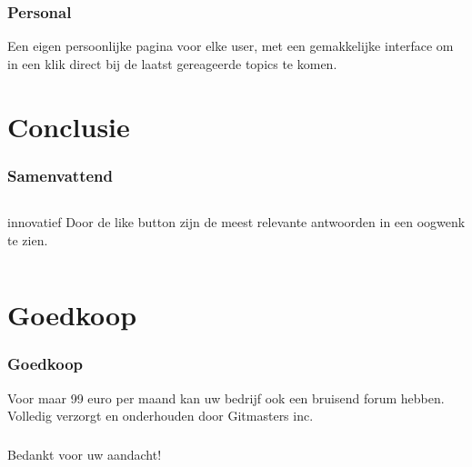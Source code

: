 \documentclass{beamer}
\begin{document}
\begin{frame}
\frametitle{Personal}
Een eigen persoonlijke pagina voor elke user, met een gemakkelijke interface om in een klik direct bij de laatst gereageerde topics te komen. 
\end{frame}



\section{Conclusie}

\begin{frame}
\frametitle{Samenvattend}
\begin{columns}
\begin{block}{innovatief}
Door de like button zijn de meest relevante antwoorden in een oogwenk te zien. 
\end{block}
\end{columns}
\end{frame}

\section{Goedkoop}

\begin{frame}
\frametitle{Goedkoop}
Voor maar 99 euro per maand kan uw bedrijf ook een bruisend forum hebben. \\
Volledig verzorgt en onderhouden door Gitmasters inc. 
\end{frame}

\begin{frame}
\frametitle{}
Bedankt voor uw aandacht!
\end{frame}


\end{document}
